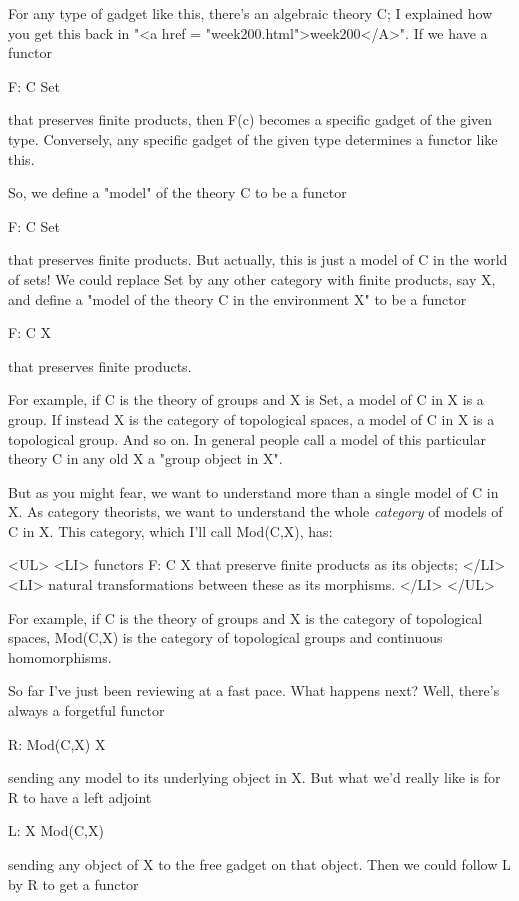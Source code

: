 For any type of gadget like this, there's an algebraic theory C; I
explained how you get this back in "<a href = "week200.html">week200</A>".  If we have a functor

F: C \to  Set

that preserves finite products, then F(c) becomes a specific gadget of the
given type.  Conversely, any specific gadget of the given type determines
a functor like this.  

So, we define a "model" of the theory C to be a functor 

F: C \to  Set

that preserves finite products.  But actually, this is just a model of
C in the world of sets!  We could replace Set by any other category
with finite products, say X, and define a "model of the theory C in
the environment X" to be a functor

F: C \to  X

that preserves finite products.  

For example, if C is the theory of groups and X is Set, a model of C
in X is a group.  If instead X is the category of topological spaces,
a model of C in X is a topological group.  And so on.  In general
people call a model of this particular theory C in any old X a 
"group object in X".

But as you might fear, we want to understand more than a single model
of C in X.  As category theorists, we want to understand the whole
\emph{category} of models of C in X.  This category, which I'll call
Mod(C,X), has:

<UL>
<LI>
 functors F: C \to  X that preserve finite products as its objects;
</LI>
<LI> natural transformations between these as its morphisms.
</LI>
</UL>


For example, if C is the theory of groups and X is the category of 
topological spaces, Mod(C,X) is the category of topological groups
and continuous homomorphisms.

So far I've just been reviewing at a fast pace.  What happens next?
Well, there's always a forgetful functor

R: Mod(C,X) \to  X

sending any model to its underlying object in X.  But what we'd really 
like is for R to have a left adjoint 

L: X \to  Mod(C,X)

sending any object of X to the free gadget on that object.  Then we
could follow L by R to get a functor

